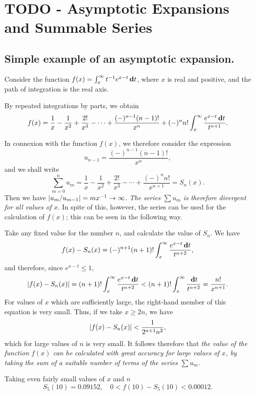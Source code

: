 \chapter{TODO - Asymptotic Expansions and Summable Series}

\section{Simple example of an asymptotic expansion.}

Consider the function
$f(x) = \int_{x}^{\infty} t^{-1} e^{x-t} \, \mathbf{d} t$,
where $x$ is real and positive, and the path of integration is the
real axis.

By repeated integrations by parts, we obtain
$$
f(x)
=
\frac{1}{x}
- \frac{1}{x^{2}}
+ \frac{2!}{x^{3}}
- \cdots
+ \frac{ (-)^{n-1} (n-1)!}{x^{n}}
+ (-)^{n} n! \int_{x}^{\infty} \frac{e^{x-t} \, \mathbf{d} t}{t^{n+1}}.
$$

In connexion with the function $f(x)$, we therefore consider the
expression
$$
u_{n-1}
=
\frac{ (-)^{n-1} (n-1)!}{x^{n}},
$$
and we shall write
$$
\sum_{m=0}^{n}
u_{m}
=
\frac{1}{x}
- \frac{1}{x^{2}}
+ \frac{2!}{x^{3}}
- \cdots
+ \frac{ (-)^{n} n!}{x^{n+1}}
=
S_{n}(x).
$$
Then we have $\left| u_{m}/u_{m-1} \right| = mx^{-1} \rightarrow \infty$.
\emph{The series $\sum u_{m}$ is therefore divergent for all values of
  $x$}. 
In spite of this, however, the series can
be used for the calculation of $f(x)$; this can be seen in the following way.

Take any fixed value for the number $n$, and calculate the value of $S_{n}$.
We have
$$
f(x) - S_{n}(x)
=
(-)^{n+1} (n+1)! 
\int_{x}^{\infty} \frac{e^{x-t} \, \mathbf{d} t}{t^{n+2}},
$$
and therefore, since $e^{x-t} \leq 1$,
$$
\left|  f(x) - S_{n}(x)  \right|
=
(n+1)!
\int_{x}^{\infty}
\frac{e^{x-t} \, \mathbf{d} t}{t^{n+2}}
<
(n+1)!
\int_{x}^{\infty} \frac{\, \mathbf{d} t}{t^{n+2}}
=
\frac{n!}{x^{n+1}}.
$$
For values of $x$ which are sufficiently large, the right-hand member
of this equation is very small. Thus, if we take $x \geq 2n$, we have
$$
\left|  f(x) - S_{n}(x) \right|
<
\frac{1}{2^{n+1} n^{2}},
$$
which for large values of $n$ is very small. It follows therefore that
\emph{the value of the function $f(x)$ can he calculated with great
  accuracy for large values of $x$, by taking the sum of a suitable
  number of terms of the series $\sum u_{m}$}.

Taking even fairly small values of $x$ and $n$
$$
S_{5}(10) = 0.09152,
\quad
0 < f(10) - S_{5}(10) < 0.00012.
$$
%
%

